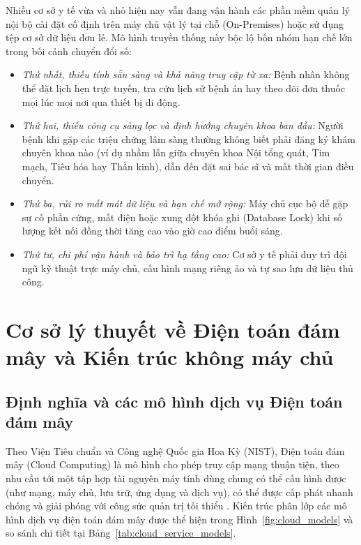 Nhiều cơ sở y tế vừa và nhỏ hiện nay vẫn đang vận hành các phần mềm quản lý nội bộ cài đặt cố định trên máy chủ vật lý tại chỗ (On-Premises) hoặc sử dụng tệp cơ sở dữ liệu đơn lẻ. Mô hình truyền thống này bộc lộ bốn nhóm hạn chế lớn trong bối cảnh chuyển đổi số:
\begin{itemize}
    \item \textit{Thứ nhất, thiếu tính sẵn sàng và khả năng truy cập từ xa:} Bệnh nhân không thể đặt lịch hẹn trực tuyến, tra cứu lịch sử bệnh án hay theo dõi đơn thuốc mọi lúc mọi nơi qua thiết bị di động.
    \item \textit{Thứ hai, thiếu công cụ sàng lọc và định hướng chuyên khoa ban đầu:} Người bệnh khi gặp các triệu chứng lâm sàng thường không biết phải đăng ký khám chuyên khoa nào (ví dụ nhầm lẫn giữa chuyên khoa Nội tổng quát, Tim mạch, Tiêu hóa hay Thần kinh), dẫn đến đặt sai bác sĩ và mất thời gian điều chuyển.
    \item \textit{Thứ ba, rủi ro mất mát dữ liệu và hạn chế mở rộng:} Máy chủ cục bộ dễ gặp sự cố phần cứng, mất điện hoặc xung đột khóa ghi (Database Lock) khi số lượng kết nối đồng thời tăng cao vào giờ cao điểm buổi sáng.
    \item \textit{Thứ tư, chi phí vận hành và bảo trì hạ tầng cao:} Cơ sở y tế phải duy trì đội ngũ kỹ thuật trực máy chủ, cấu hình mạng riêng ảo và tự sao lưu dữ liệu thủ công.
\end{itemize}

\section{Cơ sở lý thuyết về Điện toán đám mây và Kiến trúc không máy chủ}

\subsection{Định nghĩa và các mô hình dịch vụ Điện toán đám mây}

Theo Viện Tiêu chuẩn và Công nghệ Quốc gia Hoa Kỳ (NIST), Điện toán đám mây (Cloud Computing) là mô hình cho phép truy cập mạng thuận tiện, theo nhu cầu tới một tập hợp tài nguyên máy tính dùng chung có thể cấu hình được (như mạng, máy chủ, lưu trữ, ứng dụng và dịch vụ), có thể được cấp phát nhanh chóng và giải phóng với công sức quản trị tối thiểu \cite{mell2011nist}. Kiến trúc phân lớp các mô hình dịch vụ điện toán đám mây được thể hiện trong Hình~\ref{fig:cloud_models} và so sánh chi tiết tại Bảng~\ref{tab:cloud_service_models}.

